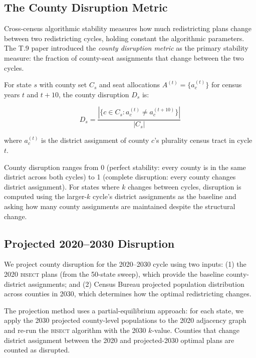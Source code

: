 \label{sec:stability}

\subsection{The County Disruption Metric}

Cross-census algorithmic stability measures how much redistricting plans change
between two redistricting cycles, holding constant the algorithmic parameters.
The T.9 paper introduced the \textit{county disruption metric} as the primary
stability measure: the fraction of county-seat assignments that change between
the two cycles.

\begin{definition}
For state $s$ with county set $C_s$ and seat allocations $A^{(t)} = \{a_c^{(t)}\}$
for census years $t$ and $t+10$, the county disruption $D_s$ is:

\begin{equation}
D_s = \frac{|\{c \in C_s : a_c^{(t)} \neq a_c^{(t+10)}\}|}{|C_s|}
\end{equation}

where $a_c^{(t)}$ is the district assignment of county $c$'s plurality census tract
in cycle $t$.
\end{definition}

County disruption ranges from 0 (perfect stability: every county is in the same
district across both cycles) to 1 (complete disruption: every county changes district
assignment). For states where $k$ changes between cycles, disruption is computed
using the larger-$k$ cycle's district assignments as the baseline and asking how many
county assignments are maintained despite the structural change.

\subsection{Projected 2020--2030 Disruption}

We project county disruption for the 2020--2030 cycle using two inputs:
(1) the 2020 \textsc{bisect} plans (from the 50-state sweep), which provide the
baseline county-district assignments; and (2) Census Bureau projected population
distribution across counties in 2030, which determines how the optimal redistricting
changes.

The projection method uses a partial-equilibrium approach: for each state, we apply
the 2030 projected county-level populations to the 2020 adjacency graph and re-run
the \textsc{bisect} algorithm with the 2030 $k$-value. Counties that change district
assignment between the 2020 and projected-2030 optimal plans are counted as disrupted.

